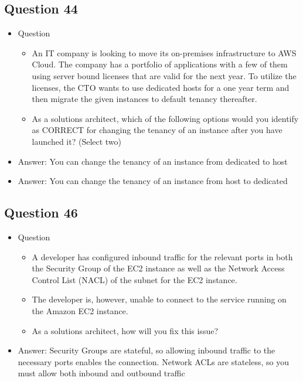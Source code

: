 \documentclass[]{scrartcl}
\begin{document}
\subsection{Question 44}
\begin{itemize}
	\item Question
	\begin{itemize}
		\item An IT company is looking to move its on-premises infrastructure to AWS Cloud. The company has a portfolio of applications with a few of them using server bound licenses that are valid for the next year. To utilize the licenses, the CTO wants to use dedicated hosts for a one year term and then migrate the given instances to default tenancy thereafter.
		\item As a solutions architect, which of the following options would you identify as CORRECT for changing the tenancy of an instance after you have launched it? (Select two)
	\end{itemize}
	\item Answer: You can change the tenancy of an instance from dedicated to host
	\item Answer: You can change the tenancy of an instance from host to dedicated
\end{itemize}

\subsection{Question 46}
\begin{itemize}
	\item Question
	\begin{itemize}
		\item A developer has configured inbound traffic for the relevant ports in both the Security Group of the EC2 instance as well as the Network Access Control List (NACL) of the subnet for the EC2 instance. \item The developer is, however, unable to connect to the service running on the Amazon EC2 instance.
		\item As a solutions architect, how will you fix this issue?
	\end{itemize}
	\item Answer: Security Groups are stateful, so allowing inbound traffic to the necessary ports enables the connection. Network ACLs are stateless, so you must allow both inbound and outbound traffic
\end{itemize}
\end{document}
